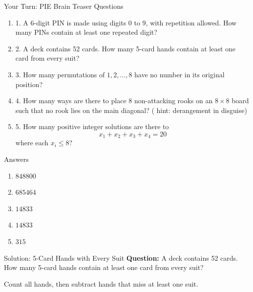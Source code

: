 \begin{frame}{Your Turn: PIE Brain Teaser Questions}
  \begin{enumerate}
    \item 1. A 6-digit PIN is made using digits \(0\) to \(9\), with repetition allowed.
    How many PINs contain at least one repeated digit?

    \item 2. A deck contains 52 cards. How many 5-card hands contain at least one card from every suit?

    \item 3. How many permutations of \(1,2,\dots,8\) have no number in its original position?

    \item 4. How many ways are there to place 8 non-attacking rooks on an \(8\times 8\) board such that no rook lies on the main diagonal? ( hint: derangement in disguise)

    \item 5. How many positive integer solutions are there to
    \[
      x_1+x_2+x_3+x_4=20
    \]
    where each \(x_i\le 8\)?

  \end{enumerate}
\end{frame}

\begin{frame}{Answers}
  \begin{enumerate}
    \item \(848800\)
    \item \(685464\)
    \item \(14833\)
    \item \(14833\)
    \item \(315\)
  \end{enumerate}
\end{frame}


\begin{frame}{Solution: 5-Card Hands with Every Suit}
  \textcolor{sqt-question}{
    \textbf{Question:}
    A deck contains 52 cards. How many 5-card hands contain at least one card from every suit?
  }

  \begin{sqt:tip}
    Count all hands, then subtract hands that miss at least one suit.
  \end{sqt:tip}
\end{frame}


